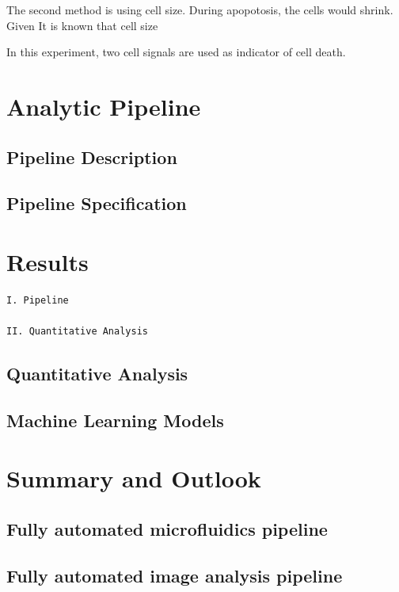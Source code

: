 \documentclass[pdftex,12pt,a4paper]{report}
\begin{document}
The second method is using cell size. During apopotosis, the cells would shrink. Given It is known that cell size %

In this experiment, two cell signals are used as indicator of cell death. %

\chapter{Analytic Pipeline}

\section{Pipeline Description}

\section{Pipeline Specification}

\chapter{Results}


\begin{verbatim}
I. Pipeline

II. Quantitative Analysis
\end{verbatim}

\section{Quantitative Analysis}

\section{Machine Learning Models}

\chapter{Summary and Outlook}

\section{Fully automated microfluidics pipeline}

\section{Fully automated image analysis pipeline}
\end{document}
